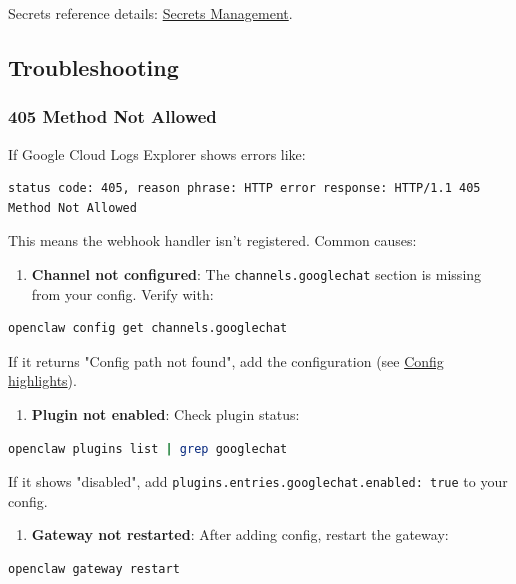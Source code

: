 Secrets reference details: \href{/gateway/secrets}{Secrets Management}.

\subsection{Troubleshooting}


\subsubsection{405 Method Not Allowed}


If Google Cloud Logs Explorer shows errors like:

\begin{lstlisting}
status code: 405, reason phrase: HTTP error response: HTTP/1.1 405 Method Not Allowed
\end{lstlisting}


This means the webhook handler isn't registered. Common causes:

\begin{enumerate}
  \item \textbf{Channel not configured}: The \texttt{channels.googlechat} section is missing from your config. Verify with:
\end{enumerate}


\begin{lstlisting}[language=bash]
   openclaw config get channels.googlechat
\end{lstlisting}


If it returns "Config path not found", add the configuration (see \href{\#config-highlights}{Config highlights}).

\begin{enumerate}
  \item \textbf{Plugin not enabled}: Check plugin status:
\end{enumerate}


\begin{lstlisting}[language=bash]
   openclaw plugins list | grep googlechat
\end{lstlisting}


If it shows "disabled", add \texttt{plugins.entries.googlechat.enabled: true} to your config.

\begin{enumerate}
  \item \textbf{Gateway not restarted}: After adding config, restart the gateway:
\end{enumerate}


\begin{lstlisting}[language=bash]
   openclaw gateway restart
\end{lstlisting}


